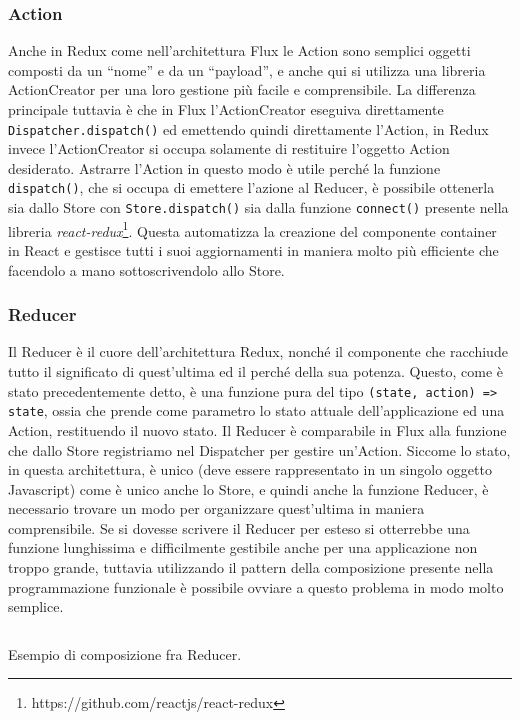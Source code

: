 \subsubsection*{Action}
Anche in Redux come nell'architettura Flux le Action sono semplici oggetti composti da un “nome” e da un “payload”, e anche qui si utilizza una libreria ActionCreator per una loro gestione più facile e comprensibile. La differenza principale tuttavia è che in Flux l'ActionCreator eseguiva direttamente \texttt{Dispatcher.dispatch()} ed emettendo quindi direttamente l'Action, in Redux invece l'ActionCreator si occupa solamente di restituire l'oggetto Action desiderato. Astrarre l'Action in questo modo è utile perché la funzione \texttt{dispatch()}, che si occupa di emettere l'azione al Reducer, è possibile ottenerla sia dallo Store con \texttt{Store.dispatch()} sia dalla funzione \texttt{connect()} presente nella libreria \textit{react-redux}\footnote{https://github.com/reactjs/react-redux}. Questa automatizza la creazione del componente container in React e gestisce tutti i suoi aggiornamenti in maniera molto più efficiente che facendolo a mano sottoscrivendolo allo Store.

\subsubsection*{Reducer}
Il Reducer è il cuore dell'architettura Redux, nonché il componente che racchiude tutto il significato di quest'ultima ed il perché della sua potenza. Questo, come è stato precedentemente detto, è una funzione pura del tipo \texttt{(state, action) => state}, ossia che prende come parametro lo stato attuale dell'applicazione ed una Action, restituendo il nuovo stato. Il Reducer è comparabile in Flux alla funzione che dallo Store registriamo nel Dispatcher per gestire un'Action.
Siccome lo stato, in questa architettura, è unico (deve essere rappresentato in un singolo oggetto Javascript) come è unico anche lo Store, e quindi anche la funzione Reducer, è necessario trovare un modo per organizzare quest'ultima in maniera comprensibile. Se si dovesse scrivere il Reducer per esteso si otterrebbe una funzione lunghissima e difficilmente gestibile anche per una applicazione non troppo grande, tuttavia utilizzando il pattern della composizione presente nella programmazione funzionale è possibile ovviare a questo problema in modo molto semplice.

\begin{listing}[ht]
\inputminted{javascript}{sources/exampleReduxReducer.js}
\caption{Esempio di composizione fra Reducer.} 
\label{exampleReduxReducer} 
\end{listing}

